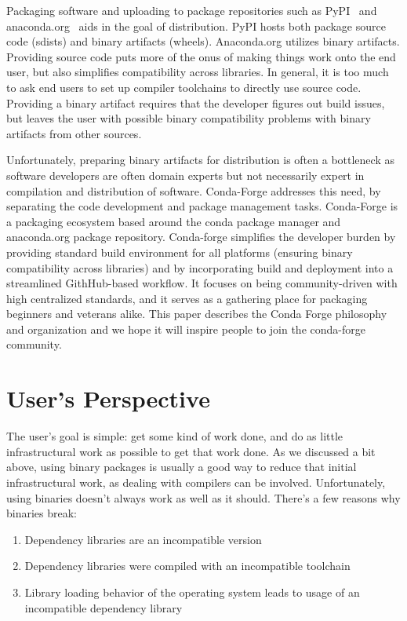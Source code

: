 \documentclass[fleqn,10pt,lineno]{wlpeerj} %
\begin{document}
Packaging software and uploading to package repositories such as PyPI~\cite{??}
and anaconda.org~\cite{???} aids in the goal of distribution. PyPI hosts both
package source code (sdists) and binary artifacts (wheels). Anaconda.org
utilizes binary artifacts. Providing source code puts more of the onus of making
things work onto the end user, but also simplifies compatibility across
libraries. In general, it is too much to ask end users to set up compiler
toolchains to directly use source code. Providing a binary artifact requires
that the developer figures out build issues, but leaves the user with possible
binary compatibility problems with binary artifacts from other sources.

Unfortunately, preparing binary artifacts for distribution is often a bottleneck
as software developers are often domain experts but not necessarily expert in
compilation and distribution of software. Conda-Forge addresses this need, by
separating the code development and package management tasks. Conda-Forge is a
packaging ecosystem based around the conda package manager and anaconda.org
package repository. Conda-forge simplifies the developer burden by providing
standard build environment for all platforms (ensuring binary compatibility
across libraries) and by incorporating build and deployment into a streamlined
GithHub-based workflow. It focuses on being community-driven with high
centralized standards, and it serves as a gathering place for packaging
beginners and veterans alike. This paper describes the Conda Forge philosophy
and organization and we hope it will inspire people to join the conda-forge
community.

\section*{User's Perspective}

The user's goal is simple: get some kind of work done, and do as little
infrastructural work as possible to get that work done. As we discussed a bit
above, using binary packages is usually a good way to reduce that initial
infrastructural work, as dealing with compilers can be involved. Unfortunately,
using binaries doesn't always work as well as it should. There's a few reasons
why binaries break:

\begin{enumerate}
  \item Dependency libraries are an incompatible version
  \item Dependency libraries were compiled with an incompatible toolchain
  \item Library loading behavior of the operating system leads to usage of an
    incompatible dependency library
\end{enumerate}
\end{document}
